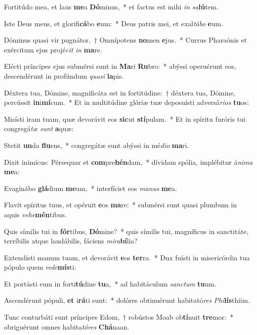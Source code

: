 \item Fortitúdo mea, et laus \textbf{me}a \textbf{Dó}minus,~* et factus est mihi \textit{in} \textit{sa}\textbf{lú}tem.
\item Iste Deus meus, et glorifi\textbf{cá}bo \textbf{e}um:~* Deus patris mei, et exal\textit{tá}\textit{bo} \textbf{e}um.
\item Dóminus quasi vir pugnátor,~† Omnípotens \textbf{no}men \textbf{e}jus.~* Currus Pharaónis et exércitum ejus projé\textit{cit} \textit{in} \textbf{ma}re.
\item Elécti príncipes ejus submérsi sunt in \textbf{Ma}ri \textbf{Ru}bro:~* abýssi operuérunt eos, descendérunt in profúndum \textit{qua}\textit{si} \textbf{la}pis.
\item Déxtera tua, Dómine, magnificáta est in fortitúdine:~† déxtera tua, Dómine, percússit \textbf{in}i\textbf{mí}cum.~* Et in multitúdine glóriæ tuæ deposuísti adversá\textit{ri}\textit{os} \textbf{tu}os:
\item Misísti iram tuam, quæ devorávit eos \textbf{sic}ut \textbf{stí}pulam.~* Et in spíritu furóris tui congregá\textit{tæ} \textit{sunt} \textbf{a}quæ:
\item Stetit \textbf{un}da \textbf{flu}ens,~* congregátæ sunt abýssi in mé\textit{di}\textit{o} \textbf{ma}ri.
\item Dixit inimícus: Pérsequar et \textbf{com}pre\textbf{hén}dam,~* dívidam spólia, implébitur á\textit{ni}\textit{ma} \textbf{me}a:
\item Evaginábo \textbf{glá}dium \textbf{me}um,~* interfíciet eos \textit{ma}\textit{nus} \textbf{me}a.
\item Flavit spíritus tuus, et opéruit \textbf{e}os \textbf{ma}re:~* submérsi sunt quasi plumbum in aquis \textit{ve}\textit{he}\textbf{mén}tibus.
\item Quis símilis tui in \textbf{fór}tibus, \textbf{Dó}mine?~* quis símilis tui, magníficus in sanctitáte, terríbilis atque laudábilis, fáciens \textit{mi}\textit{ra}\textbf{bí}lia?
\item Extendísti manum tuam, et devorávit \textbf{e}os \textbf{ter}ra.~* Dux fuísti in misericórdia tua pópulo quem \textit{red}\textit{e}\textbf{mís}ti:
\item Et portásti eum in forti\textbf{tú}dine \textbf{tu}a,~* ad habitáculum \textit{sanc}\textit{tum} \textbf{tu}um.
\item Ascendérunt pópuli, \textbf{et} i\textbf{rá}ti sunt:~* dolóres obtinuérunt habitató\textit{res} \textit{Phi}\textbf{lís}thiim.
\item Tunc conturbáti sunt príncipes Edom,~† robústos Moab ob\textbf{tí}nuit \textbf{tre}mor:~* obriguérunt omnes habita\textit{tó}\textit{res} \textbf{Chá}naan.
